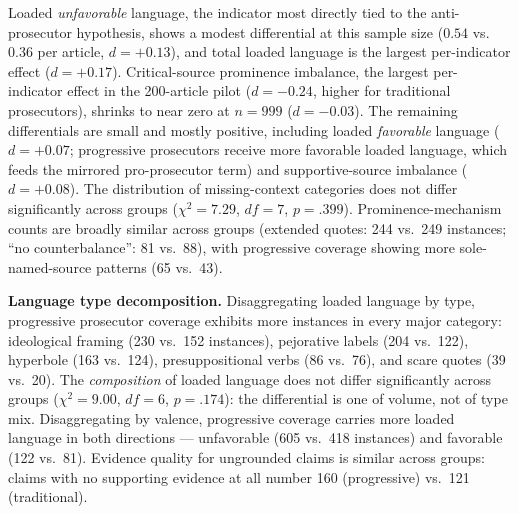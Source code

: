 \documentclass[12pt, letterpaper]{article}
\begin{document}
\begin{appendices}
Loaded \emph{unfavorable} language, the indicator most directly tied to the anti-prosecutor hypothesis, shows a modest differential at this sample size ($0.54$ vs.\ $0.36$ per article, $d = +0.13$), and total loaded language is the largest per-indicator effect ($d = +0.17$). Critical-source prominence imbalance, the largest per-indicator effect in the 200-article pilot ($d = -0.24$, higher for traditional prosecutors), shrinks to near zero at $n = 999$ ($d = -0.03$). The remaining differentials are small and mostly positive, including loaded \emph{favorable} language ($d = +0.07$; progressive prosecutors receive more favorable loaded language, which feeds the mirrored pro-prosecutor term) and supportive-source imbalance ($d = +0.08$). The distribution of missing-context categories does not differ significantly across groups ($\chi^2 = 7.29$, $df = 7$, $p = .399$). Prominence-mechanism counts are broadly similar across groups (extended quotes: 244 vs.\ 249 instances; ``no counterbalance'': 81 vs.\ 88), with progressive coverage showing more sole-named-source patterns (65 vs.\ 43).

\textbf{Language type decomposition.} Disaggregating loaded language by type, progressive prosecutor coverage exhibits more instances in every major category: ideological framing (230 vs.\ 152 instances), pejorative labels (204 vs.\ 122), hyperbole (163 vs.\ 124), presuppositional verbs (86 vs.\ 76), and scare quotes (39 vs.\ 20). The \emph{composition} of loaded language does not differ significantly across groups ($\chi^2 = 9.00$, $df = 6$, $p = .174$): the differential is one of volume, not of type mix. Disaggregating by valence, progressive coverage carries more loaded language in both directions --- unfavorable (605 vs.\ 418 instances) and favorable (122 vs.\ 81). Evidence quality for ungrounded claims is similar across groups: claims with no supporting evidence at all number 160 (progressive) vs.\ 121 (traditional).


\end{appendices}
\end{document}
